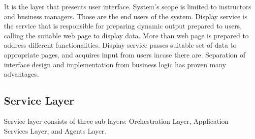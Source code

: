 \documentclass[12pt,a4paper,final,twoside,onecolumn,titlepage]{book}
\begin{document}
It is the layer that presents user interface. System’s scope is limited to instructors and business managers. Those are the end users of the system. Display service is the service that is responsible for preparing dynamic output prepared to users, calling the suitable web page to display data. More than web page is prepared to address different functionalities. Display service passes suitable set of data to appropriate pages, and acquires input from users incase there are. Separation of interface design and implementation from business logic has proven many advantages.

\subsection{Service Layer}

Service layer consists of three sub layers: Orchestration Layer, Application Services Layer, and Agents Layer.
\end{document}
